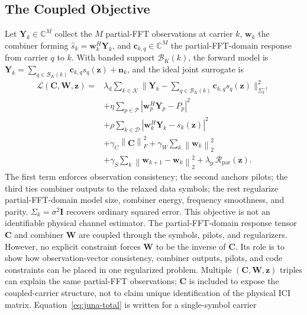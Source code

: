 \documentclass[journal]{IEEEtran}
\newcommand{\C}{\mathbb{C}}
\newcommand{\Ht}{^{H}}
\newcommand{\norm}[1]{\left\lVert #1 \right\rVert}
\newcommand{\abs}[1]{\left\lvert #1 \right\rvert}
\begin{document}
\subsection{The Coupled Objective}\label{ssec:juna-objective}
Let $\mathbf Y_k\in\C^M$ collect the $M$ partial-FFT observations at
carrier $k$, $\mathbf w_k$ the combiner forming $\widehat s_k=\mathbf
w_k\Ht\mathbf Y_k$, and $\mathbf c_{k,q}\in\C^M$ the partial-FFT-domain response from carrier
$q$ to $k$. With banded support $\mathcal B_K(k)$, the forward model is $\mathbf
Y_k=\sum_{q\in\mathcal B_K(k)}\mathbf c_{k,q}s_q(\mathbf z)+\mathbf n_k$, and
the ideal joint surrogate is
\begin{equation}
  \begin{aligned}
    \mathcal L(\mathbf C,\mathbf W,\mathbf z)
    ={}&\lambda_{\mathrm d}\sum_{k\in\mathcal K}
        \Big\|\mathbf Y_k-\sum_{q\in\mathcal B_K(k)}
        \mathbf c_{k,q}s_q(\mathbf z)\Big\|_{\Sigma_k^{-1}}^2\\
    &+\eta\sum_{p\in\mathcal P}\abs{\mathbf w_p\Ht\mathbf Y_p-P_p}^2\\
    &+\rho\sum_{k\in\mathcal D}
      \abs{\mathbf w_k\Ht\mathbf Y_k-s_k(\mathbf z)}^2\\
    &+\gamma_C\norm{\mathbf C}_F^2+\gamma_W\sum_{k}\norm{\mathbf w_k}_2^2\\
    &+\gamma_S\sum_{k}\norm{\mathbf w_{k+1}-\mathbf w_k}_2^2
      +\lambda_{\mathrm p}\,\mathcal R_{\mathrm{par}}(\mathbf z).
  \end{aligned}
  \label{eq:juna-total}
\end{equation}
The first term enforces observation consistency; the second anchors pilots; the
third ties combiner outputs to the relaxed data symbols; the rest regularize
partial-FFT-domain model size, combiner energy, frequency smoothness, and parity.
$\Sigma_k=\sigma^2\mathbf I$ recovers ordinary squared error. This objective is
not an identifiable physical channel estimator. The partial-FFT-domain response
tensor $\mathbf C$ and combiner $\mathbf W$ are coupled through the symbols,
pilots, and regularizers. However, no explicit constraint forces $\mathbf W$ to
be the inverse of $\mathbf C$. Its role is to show how observation-vector consistency, combiner
outputs, pilots, and code constraints can be placed in one regularized problem.
Multiple $(\mathbf C,\mathbf W,\mathbf z)$ triples can explain the same partial-FFT
observations; $\mathbf C$ is included to expose the coupled-carrier structure,
not to claim unique identification of the physical ICI matrix.
Equation~\eqref{eq:juna-total} is written for a single-symbol carrier
\end{document}
